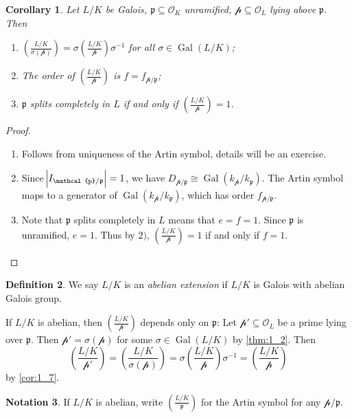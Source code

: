 \documentclass[11pt]{article}
\theoremstyle{definition}
\newtheorem{definition}{Definition}[section]
\newtheorem{notation}[definition]{Notation}
\theoremstyle{plain}
\newtheorem{corollary}[definition]{Corollary}
\theoremstyle{remark}
\DeclareMathOperator{\Gal}{Gal}
\newcommand{\cO}{\mathcal{O}}
\newcommand{\cp}{\mathcal{p}}
\newcommand{\fp}{\mathfrak{p}}
\newcommand{\leg}[2]{\left(\frac{#1}{#2}\right)}
\begin{document}
\begin{corollary}\label{cor:1_7}
    Let $L/K$ be Galois, $\fp \subseteq \cO_K$ unramified, $\cp \subseteq \cO_L$ lying above $\fp$. Then
    \begin{enumerate}
        \item $\leg{L/K}{\sigma(\cp)} = \sigma \leg{L/K}{\cp} \sigma^{-1}$ for all $\sigma \in \Gal(L/K)$;

        \item The order of $\leg{L/K}{\cp}$ is $f = f_{\cp / \fp}$;

        \item $\fp$ splits completely in $L$ if and only if $\leg{L/K}{\cp} = 1$.
    \end{enumerate}
\end{corollary}
\begin{proof}\phantom{}
    \begin{enumerate}
        \item Follows from uniqueness of the Artin symbol, details will be an exercise.

        \item Since $\abs{I_{\cp / \fp}} = 1$, we have $D_{\cp / \fp} \cong \Gal(k_\cp / k_\fp)$. The Artin symbol maps to a generator of $\Gal(k_\cp / k_\fp)$, which has order $f_{\cp / \fp}$.

        \item Note that $\fp$ splits completely in $L$ means that $e = f = 1$. Since $\fp$ is unramified, $e = 1$. Thus by $2)$, $\leg{L/K}{\cp} = 1$ if and only if $f = 1$. \qedhere
    \end{enumerate}
\end{proof}

\begin{definition}\label{def:1_8}
    We say $L/K$ is an \emph{abelian extension} if $L/K$ is Galois with abelian Galois group.
\end{definition}

If $L/K$ is abelian, then $\leg{L/K}{\cp}$ depends only on $\fp$: Let $\cp' \subseteq \cO_L$ be a prime lying over $\fp$. Then $\cp' = \sigma(\cp)$ for some $\sigma \in \Gal(L/K)$ by \autoref{thm:1_2}. Then
\begin{equation*}
    \leg{L/K}{\cp'} = \leg{L/K}{\sigma(\cp)} = \sigma \leg{L/K}{\cp} \sigma^{-1} = \leg{L/K}{\cp}
\end{equation*}
by \autoref{cor:1_7}.

\begin{notation}\label{not:1_9}
    If $L/K$ is abelian, write $\leg{L/K}{\fp}$ for the Artin symbol for any $\cp / \fp$.
\end{notation}
\end{document}
